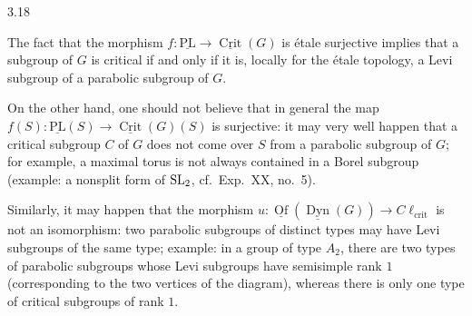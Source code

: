 \begin{remark}{3.18}\label{XXVI.3.18}
\begin{enumeratei}
\item The fact that the morphism $f:\underline{\mathrm{PL}}\to\underline{\operatorname{Crit}}(G)$ is \'etale surjective implies that a subgroup of $G$ is critical if and only if it is, locally for the \'etale topology, a Levi subgroup of a parabolic subgroup of $G$.

On the other hand, one should not believe that in general the map $f(S):\underline{\mathrm{PL}}(S)\to\underline{\operatorname{Crit}}(G)(S)$ is surjective: it may very well happen that a critical subgroup $C$ of $G$ does not come over $S$ from a parabolic subgroup of $G$; for example, a maximal torus is not always contained in a Borel subgroup (example: a nonsplit form of $\operatorname{SL}_2$, cf.~Exp.~XX, no.~5).
\item Similarly, it may happen that the morphism $u:\underline{\operatorname{Of}}(\underline{\operatorname{Dyn}}(G))\to C\ell_{\mathrm{crit}}$ is not an isomorphism: two parabolic subgroups of distinct types may have Levi subgroups of the same type; example: in a group of type $A_2$, there are two types of parabolic subgroups whose Levi subgroups have semisimple rank $1$ (corresponding to the two vertices of the diagram), whereas there is only one type of critical subgroups of rank $1$.


\end{enumeratei}
\end{remark}
